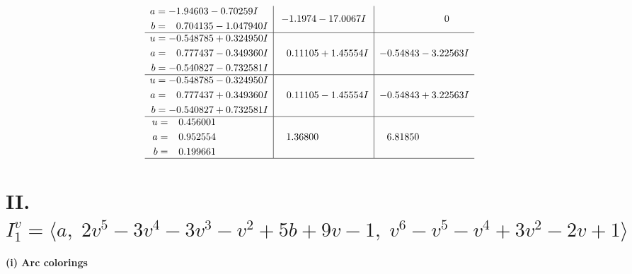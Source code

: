 \documentclass[1p]{elsarticle_modified}
\theoremstyle{definition}
\begin{document}
$$\begin{array}{c|c|c}
\begin{aligned}
a &= -1.94603 - 0.70259 I \\
b &= \phantom{-}0.704135 - 1.047940 I\end{aligned}
 & -1.1974 - 17.0067 I & \phantom{-0.000000 } 0 \\ \hline\begin{aligned}
u &= -0.548785 + 0.324950 I \\
a &= \phantom{-}0.777437 - 0.349360 I \\
b &= -0.540827 - 0.732581 I\end{aligned}
 & \phantom{-}0.11105 + 1.45554 I & -0.54843 - 3.22563 I \\ \hline\begin{aligned}
u &= -0.548785 - 0.324950 I \\
a &= \phantom{-}0.777437 + 0.349360 I \\
b &= -0.540827 + 0.732581 I\end{aligned}
 & \phantom{-}0.11105 - 1.45554 I & -0.54843 + 3.22563 I \\ \hline\begin{aligned}
u &= \phantom{-}0.456001\phantom{ +0.000000I} \\
a &= \phantom{-}0.952554\phantom{ +0.000000I} \\
b &= \phantom{-}0.199661\phantom{ +0.000000I}\end{aligned}
 & \phantom{-}1.36800\phantom{ +0.000000I} & \phantom{-}6.81850\phantom{ +0.000000I}\\
 \hline 
 \end{array}$$\newpage\newpage\renewcommand{\arraystretch}{1}
\centering \section*{II. $I^v_{1}= \langle a,\;2 v^5-3 v^4-3 v^3- v^2+5 b+9 v-1,\;v^6- v^5- v^4+3 v^2-2 v+1 \rangle$}
\flushleft \textbf{(i) Arc colorings}\\
\end{document}
